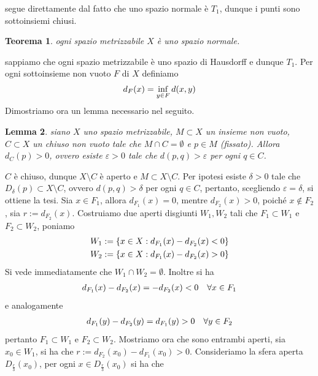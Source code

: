 \documentclass[oneside, 11pt]{amsbook}
\makeatletter
\newcommand{\0}{{(0)}}
\newcommand{\3}{{(3)}}
\theoremstyle{colonplain}
\newtheorem{thm}{Teorema}[chapter]
\newtheorem{lemma}[thm]{Lemma}
\theoremstyle{colondefinition}
\theoremstyle{colonremark}
\numberwithin{equation}{chapter}
\renewcommand{\proofname}{Dimostrazione}
\renewenvironment{proof}[1][\proofname]{\par
  \pushQED{\qed}%
  \normalfont \topsep6\p@\@plus6\p@\relax
  \trivlist
  \item[\hskip\labelsep\bfseries #1:]\ignorespaces
}{%
  \popQED\endtrivlist\@endpefalse
}
\makeatother
\begin{document}
\begin{proof}
segue direttamente dal fatto che uno spazio normale è $T_1$, dunque i punti sono sottoinsiemi chiusi.
\end{proof}
\begin{thm}
ogni spazio metrizzabile $X$ è uno spazio normale.
\end{thm}
\begin{proof}
sappiamo che ogni spazio metrizzabile è uno spazio di Hausdorff e dunque $T_1$. Per ogni sottoinsieme non vuoto $F$ di $X$ definiamo
\begin{align}
    d_F(x) = \inf_{y \in F} d(x, y) \notag
\end{align}
Dimostriamo ora un lemma necessario nel seguito.
\begin{lemma}
siano $X$ uno spazio metrizzabile, $M \subset X$ un insieme non vuoto, $C \subset X$ un chiuso non vuoto tale che $M \cap C = \emptyset$ e $p \in M$ (fissato). Allora $d_C(p) > 0$, ovvero esiste $\varepsilon > 0$ tale che $d(p, q) > \varepsilon$ per ogni $q \in C$.
\end{lemma}
\begin{proof}
$C$ è chiuso, dunque $X \setminus C$ è aperto e $M \subset X \setminus C$. Per ipotesi esiste $\delta > 0$ tale che $D_\delta (p) \subset X \setminus C$, ovvero $d(p, q) > \delta$ per ogni $q \in C$, pertanto, scegliendo $\varepsilon = \delta$, si ottiene la tesi.
\end{proof}
Sia $x \in F_1$, allora $d_{F_1}(x) = 0$, mentre $d_{F_2}(x) > 0$, poiché $x \not\in F_2$, sia $r := d_{F_2}(x)$. Costruiamo due aperti disgiunti $W_1, W_2$ tali che $F_1 \subset W_1$ e $F_2 \subset W_2$, poniamo
\begin{align}
    W_1 := \{ x \in X : d_{F_1}(x) - d_{F_2}(x) < 0 \} \notag \\
    W_2 := \{ x \in X : d_{F_1}(x) - d_{F_2}(x) > 0 \} \notag
\end{align}
Si vede immediatamente che $W_1 \cap W_2 = \emptyset$. Inoltre si ha
\begin{align}
    d_{F_1}(x) - d_{F_2}(x) = -d_{F_2}(x) < 0 \quad \forall x \in F_1 \notag
\end{align}
e analogamente
\begin{align}
    d_{F_1}(y) - d_{F_2}(y) = d_{F_1}(y) > 0 \quad \forall y \in F_2 \notag
\end{align}
pertanto $F_1 \subset W_1$ e $F_2 \subset W_2$. Mostriamo ora che sono entrambi aperti, sia $x_0 \in W_1$, si ha che $r := d_{F_2}(x_0) - d_{F_1}(x_0) > 0$. Consideriamo la sfera aperta $D_{\frac{r}{3}}(x_0)$, per ogni $x \in D_{\frac{r}{3}}(x_0)$ si ha che

\end{proof}
\end{document}
